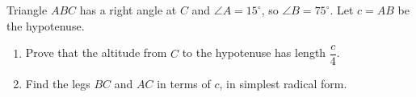 Triangle $ABC$ has a right angle at $C$ and $\angle A=15^\circ$, so $\angle B=75^\circ$. Let $c=AB$ be the hypotenuse.
\begin{enumerate}
\item[(a)] Prove that the altitude from $C$ to the hypotenuse has length $\dfrac {c}{4}$.
\item[(b)] Find the legs $BC$ and $AC$ in terms of $c$, in simplest radical form.
\end{enumerate}
